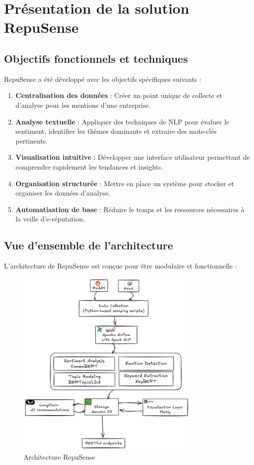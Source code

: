 \documentclass[12pt,a4paper]{report}
\begin{document}
\chapter{Présentation de la solution RepuSense}

\section{Objectifs fonctionnels et techniques}
RepuSense a été développé avec les objectifs spécifiques suivants :

\begin{enumerate}
    \item \textbf{Centralisation des données} : Créer un point unique de collecte et d'analyse pour les mentions d'une entreprise.
    \item \textbf{Analyse textuelle} : Appliquer des techniques de NLP pour évaluer le sentiment, identifier les thèmes dominants et extraire des mots-clés pertinents.
    \item \textbf{Visualisation intuitive} : Développer une interface utilisateur permettant de comprendre rapidement les tendances et insights.
    \item \textbf{Organisation structurée} : Mettre en place un système pour stocker et organiser les données d'analyse.
    \item \textbf{Automatisation de base} : Réduire le temps et les ressources nécessaires à la veille d'e-réputation.
\end{enumerate}

\section{Vue d'ensemble de l'architecture}
L'architecture de RepuSense est conçue pour être modulaire et fonctionnelle :

\begin{figure}[h]
    \centering
    \includegraphics[width=0.8\textwidth]{schema.png}
    \caption{Architecture RepuSense}
\end{figure}
\end{document}
